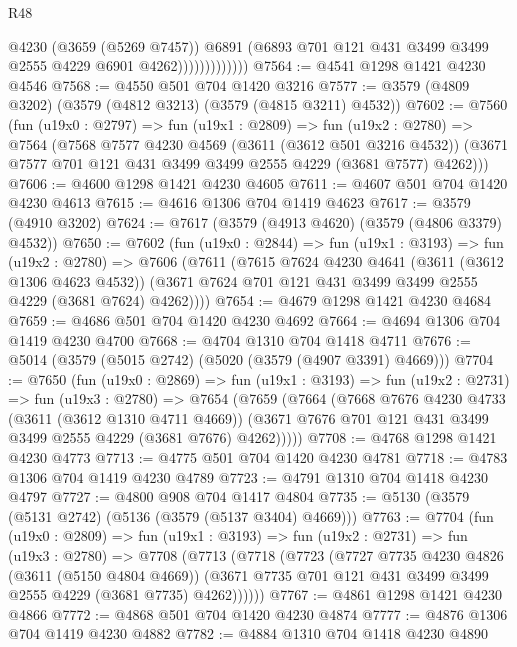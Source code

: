 \begin{lexlean}{R48}
\begin{coremodule}
                            @4230
                            (@3659 (@5269 @7457))
                            @6891
                            (@6893 @701 @121 @431 @3499 @3499 @2555 @4229 @6901 @4262)))))))))))))
@7564 := @4541 @1298 @1421 @4230 @4546
@7568 := @4550 @501 @704 @1420 @3216
@7577 := @3579 (@4809 @3202) (@3579 (@4812 @3213) (@3579 (@4815 @3211) @4532))
@7602 := @7560
    (fun (u19x0 : @2797) =>
    fun (u19x1 : @2809) =>
    fun (u19x2 : @2780) =>
    @7564
      (@7568
        @7577
        @4230
        @4569
        (@3611 (@3612 @501 @3216 @4532))
        (@3671 @7577 @701 @121 @431 @3499 @3499 @2555 @4229 (@3681 @7577) @4262)))
@7606 := @4600 @1298 @1421 @4230 @4605
@7611 := @4607 @501 @704 @1420 @4230 @4613
@7615 := @4616 @1306 @704 @1419 @4623
@7617 := @3579 (@4910 @3202)
@7624 := @7617 (@3579 (@4913 @4620) (@3579 (@4806 @3379) @4532))
@7650 := @7602
    (fun (u19x0 : @2844) =>
    fun (u19x1 : @3193) =>
    fun (u19x2 : @2780) =>
    @7606
      (@7611
        (@7615
          @7624
          @4230
          @4641
          (@3611 (@3612 @1306 @4623 @4532))
          (@3671 @7624 @701 @121 @431 @3499 @3499 @2555 @4229 (@3681 @7624) @4262))))
@7654 := @4679 @1298 @1421 @4230 @4684
@7659 := @4686 @501 @704 @1420 @4230 @4692
@7664 := @4694 @1306 @704 @1419 @4230 @4700
@7668 := @4704 @1310 @704 @1418 @4711
@7676 := @5014 (@3579 (@5015 @2742) (@5020 (@3579 (@4907 @3391) @4669)))
@7704 := @7650
    (fun (u19x0 : @2869) =>
    fun (u19x1 : @3193) =>
    fun (u19x2 : @2731) =>
    fun (u19x3 : @2780) =>
    @7654
      (@7659
        (@7664
          (@7668
            @7676
            @4230
            @4733
            (@3611 (@3612 @1310 @4711 @4669))
            (@3671 @7676 @701 @121 @431 @3499 @3499 @2555 @4229 (@3681 @7676) @4262)))))
@7708 := @4768 @1298 @1421 @4230 @4773
@7713 := @4775 @501 @704 @1420 @4230 @4781
@7718 := @4783 @1306 @704 @1419 @4230 @4789
@7723 := @4791 @1310 @704 @1418 @4230 @4797
@7727 := @4800 @908 @704 @1417 @4804
@7735 := @5130 (@3579 (@5131 @2742) (@5136 (@3579 (@5137 @3404) @4669)))
@7763 := @7704
    (fun (u19x0 : @2809) =>
    fun (u19x1 : @3193) =>
    fun (u19x2 : @2731) =>
    fun (u19x3 : @2780) =>
    @7708
      (@7713
        (@7718
          (@7723
            (@7727
              @7735
              @4230
              @4826
              (@3611 (@5150 @4804 @4669))
              (@3671 @7735 @701 @121 @431 @3499 @3499 @2555 @4229 (@3681 @7735) @4262))))))
@7767 := @4861 @1298 @1421 @4230 @4866
@7772 := @4868 @501 @704 @1420 @4230 @4874
@7777 := @4876 @1306 @704 @1419 @4230 @4882
@7782 := @4884 @1310 @704 @1418 @4230 @4890

\end{coremodule}
\end{lexlean}
